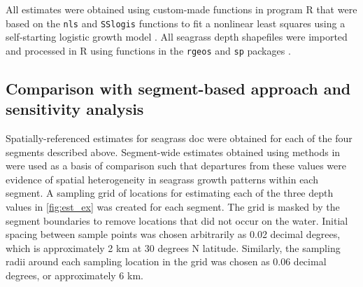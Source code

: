 \documentclass[letterpaper,12pt,oneside]{article}\usepackage[]{graphicx}\usepackage[]{color}
\begin{document}
All estimates were obtained using custom-made functions in program R that were based on the \texttt{nls} and \texttt{SSlogis} functions to fit a nonlinear least squares using a self-starting logistic growth model \citep{Bates92,RDCT14}.  All seagrass depth shapefiles were imported and processed in R using functions in the \texttt{rgeos} and \texttt{sp} packages \citep{Bivand08,Bivand14}.  

\subsection{Comparison with segment-based approach and sensitivity analysis}

Spatially-referenced estimates for seagrass \ac{doc} were obtained for each of the four segments described above.  Segment-wide estimates obtained using methods in  were used as a basis of comparison such that departures from these values were evidence of spatial heterogeneity in seagrass growth patterns within each segment.  A sampling grid of locations for estimating each of the three depth values in \cref{fig:est_ex} was created for each segment.  The grid is masked by the segment boundaries to remove locations that did not occur on the water.  Initial spacing between sample points was chosen arbitrarily as 0.02 decimal degrees, which is approximately 2 km at 30 degrees N latitude.  Similarly, the sampling radii around each sampling location in the grid was chosen as 0.06 decimal degrees, or approximately 6 km.  
\end{document}

